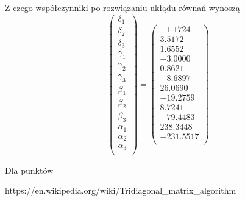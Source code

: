 \documentclass[varwidth,12pt,a4paper]{article}
\begin{document}
Z czego współczynniki po rozwiązaniu ukłądu równań wynoszą
$$
\left( \begin{array}{c}
\delta _1\\
\delta_2\\
\delta_3\\
\gamma _1\\
\gamma _2\\
\gamma_3\\
\beta _1\\
\beta _2\\
\beta _3\\
\alpha _1\\
\alpha _2\\
\alpha _3 \\
\end{array} \right) = \left( \begin{array}{c}
-1.1724 \\
3.5172 \\
1.6552 \\
-3.0000 \\
0.8621 \\
-8.6897 \\
26.0690 \\
-19.2759 \\
8.7241 \\
-79.4483 \\
238.3448 \\
-231.5517 \\
\end{array} \right) 
$$


Dla punktów 

https://en.wikipedia.org/wiki/Tridiagonal_matrix_algorithm
\end{document}
